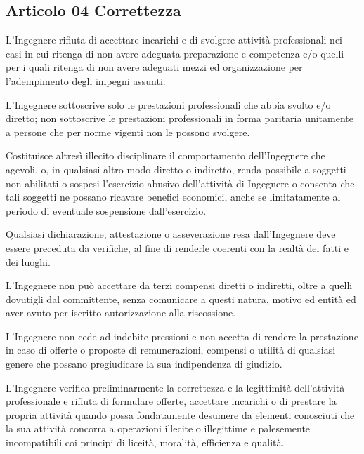 \documentclass[letterpaper,10pt,italian]{sphinxmanual}
\begin{document}
\subsection{Articolo 04 \sphinxhyphen{} Correttezza}
\label{\detokenize{capitoli/codice/codice_deontologico:articolo-04-correttezza}}\begin{description}
\sphinxAtStartPar
L’Ingegnere rifiuta di accettare incarichi e di svolgere attività professionali nei casi in cui ritenga di non avere adeguata preparazione e competenza e/o quelli per i quali ritenga di non avere adeguati mezzi ed organizzazione per l’adempimento degli impegni assunti.

\sphinxAtStartPar
L’Ingegnere sottoscrive solo le prestazioni professionali che abbia svolto e/o diretto; non sottoscrive le prestazioni professionali in forma paritaria unitamente a persone che per norme vigenti non le possono svolgere.

\sphinxAtStartPar
Costituisce altresì illecito disciplinare il comportamento dell’Ingegnere che agevoli, o, in qualsiasi altro modo diretto o indiretto, renda possibile a soggetti non abilitati o sospesi l’esercizio abusivo dell’attività di Ingegnere o consenta che tali soggetti ne possano ricavare benefici economici, anche se limitatamente al periodo di eventuale sospensione dall’esercizio.

\sphinxAtStartPar
Qualsiasi dichiarazione, attestazione o asseverazione resa dall’Ingegnere deve essere preceduta da verifiche, al fine di renderle coerenti con la realtà dei fatti e dei luoghi.

\sphinxAtStartPar
L’Ingegnere non può accettare da terzi compensi diretti o indiretti, oltre a quelli dovutigli dal committente, senza comunicare a questi natura, motivo ed entità ed aver avuto per iscritto autorizzazione alla riscossione.

\sphinxAtStartPar
L’Ingegnere non cede ad indebite pressioni e non accetta di rendere la prestazione in caso di offerte o proposte di remunerazioni, compensi o utilità di qualsiasi genere che possano pregiudicare la sua indipendenza di giudizio.

\sphinxAtStartPar
L’Ingegnere verifica preliminarmente la correttezza e la legittimità dell’attività professionale e rifiuta di formulare offerte, accettare incarichi o di prestare la propria attività quando possa fondatamente desumere da elementi conosciuti che la sua attività concorra a operazioni illecite o illegittime e palesemente incompatibili coi principi di liceità, moralità, efficienza e qualità.

\end{description}
\end{document}
